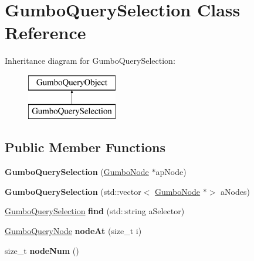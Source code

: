 \hypertarget{class_gumbo_query_selection}{}\section{Gumbo\+Query\+Selection Class Reference}
\label{class_gumbo_query_selection}
Inheritance diagram for Gumbo\+Query\+Selection\+:\begin{figure}[H]
\begin{center}
\leavevmode
\includegraphics[height=2.000000cm]{class_gumbo_query_selection}
\end{center}
\end{figure}
\subsection*{Public Member Functions}
\begin{DoxyCompactItemize}
\item 
\mbox{\label{class_gumbo_query_selection_a9173f28f175543456dffd6bb102d84f9}} 
{\bfseries Gumbo\+Query\+Selection} (\mbox{\hyperlink{gumbo_8h_a5f67d8397fda8fb7c90cc27f14ac4e7d}{Gumbo\+Node}} $\ast$ap\+Node)
\item 
\mbox{\label{class_gumbo_query_selection_a68b10821a96607eb9a7f632fdf59fcdd}} 
{\bfseries Gumbo\+Query\+Selection} (std\+::vector$<$ \mbox{\hyperlink{gumbo_8h_a5f67d8397fda8fb7c90cc27f14ac4e7d}{Gumbo\+Node}} $\ast$$>$ a\+Nodes)
\item 
\mbox{\label{class_gumbo_query_selection_ae5b7ef03e8826de6ecc4418603be0a6f}} 
\mbox{\hyperlink{class_gumbo_query_selection}{Gumbo\+Query\+Selection}} {\bfseries find} (std\+::string a\+Selector)
\item 
\mbox{\label{class_gumbo_query_selection_af9af4a0795ed9fe5855a465979bd18d0}} 
\mbox{\hyperlink{class_gumbo_query_node}{Gumbo\+Query\+Node}} {\bfseries node\+At} (size\+\_\+t i)
\item 
\mbox{\label{class_gumbo_query_selection_a516b80b015b2587a437163eff12e88ef}} 
size\+\_\+t {\bfseries node\+Num} ()
\end{DoxyCompactItemize}

